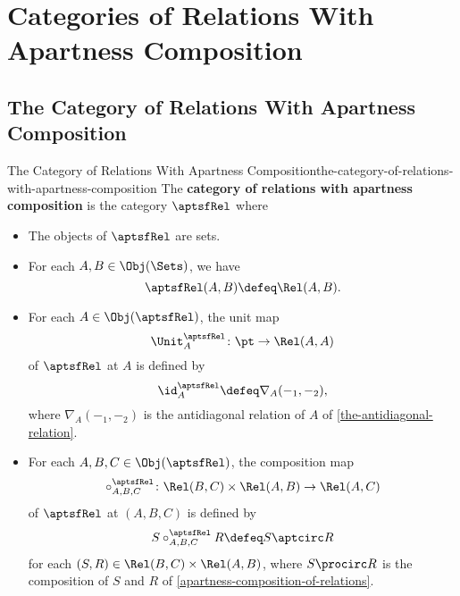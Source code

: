 \section{Categories of Relations With Apartness Composition}\label{subsection-categories-of-relations-with-apartness-composition}
\subsection{The Category of Relations With Apartness Composition}\label{subsection-the-category-of-relations-with-apartness-composition}
\begin{definition}{The Category of Relations With Apartness Composition}{the-category-of-relations-with-apartness-composition}%
    The \textbf{category of relations with apartness composition} is the category $\aptsfRel$ where
    \begin{itemize}
        \item{}The objects of $\aptsfRel$ are sets.
        \item{}For each $A,B\in\Obj(\Sets)$, we have
            \[
                \aptsfRel(A,B)
                \defeq
                \Rel(A,B).
            \]%
        \item{}For each $A\in\Obj(\aptsfRel)$, the unit map
            \[
                \Unit^{\aptsfRel}_{A}
                \colon
                \pt
                \to
                \Rel(A,A)
            \]%
            of $\aptsfRel$ at $A$ is defined by
            \[
                \id^{\aptsfRel}_{A}
                \defeq
                \nabla_{A}(-_{1},-_{2}),
            \]%
            where $\nabla_{A}(-_{1},-_{2})$ is the antidiagonal relation of $A$ of \cref{the-antidiagonal-relation}.
        \item{}For each $A,B,C\in\Obj(\aptsfRel)$, the composition map
            \[
                \circ^{\aptsfRel}_{A,B,C}%
                \colon%
                \Rel(B,C)%
                \times%
                \Rel(A,B)%
                \to%
                \Rel(A,C)%
            \]%
            of $\aptsfRel$ at $(A,B,C)$ is defined by%
            \[
                S\mathbin{{\circ}^{\aptsfRel}_{A,B,C}}R
                \defeq
                S\aptcirc R
            \]%
            for each $(S,R)\in\Rel(B,C)\times\Rel(A,B)$, where $S\procirc R$ is the composition of $S$ and $R$ of \cref{apartness-composition-of-relations}.
    \end{itemize}
\end{definition}

